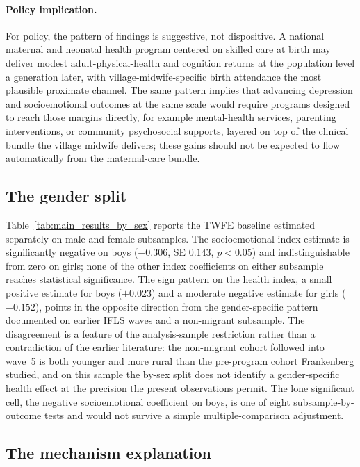 \paragraph{Policy implication.} For policy, the pattern of findings is suggestive, not dispositive. A national maternal and neonatal health program centered on skilled care at birth may deliver modest adult-physical-health and cognition returns at the population level a generation later, with village-midwife-specific birth attendance the most plausible proximate channel. The same pattern implies that advancing depression and socioemotional outcomes at the same scale would require programs designed to reach those margins directly, for example mental-health services, parenting interventions, or community psychosocial supports, layered on top of the clinical bundle the village midwife delivers; these gains should not be expected to flow automatically from the maternal-care bundle.

\subsection{The gender split}

Table~\ref{tab:main_results_by_sex} reports the TWFE baseline estimated separately on male and female subsamples. The socioemotional-index estimate is significantly negative on boys ($-0.306$, SE $0.143$, $p<0.05$) and indistinguishable from zero on girls; none of the other index coefficients on either subsample reaches statistical significance. The sign pattern on the health index, a small positive estimate for boys ($+0.023$) and a moderate negative estimate for girls ($-0.152$), points in the opposite direction from the gender-specific pattern \textcite{frankenberg2005} documented on earlier IFLS waves and a non-migrant subsample. The disagreement is a feature of the analysis-sample restriction rather than a contradiction of the earlier literature: the non-migrant cohort followed into wave~5 is both younger and more rural than the pre-program cohort Frankenberg studied, and on this sample the by-sex split does not identify a gender-specific health effect at the precision the present observations permit. The lone significant cell, the negative socioemotional coefficient on boys, is one of eight subsample-by-outcome tests and would not survive a simple multiple-comparison adjustment.

\subsection{The mechanism explanation}

